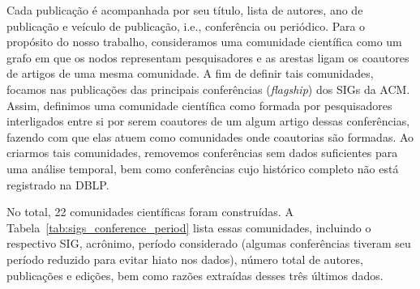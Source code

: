 Cada publicação é acompanhada por seu título, lista de autores, ano de publicação e veículo de publicação, i.e., conferência 
ou periódico. Para o propósito do nosso trabalho, consideramos uma comunidade científica como um grafo em que os nodos 
representam pesquisadores e as arestas ligam os coautores de artigos de uma mesma comunidade. A fim de definir tais 
comunidades, focamos nas publicações das principais conferências (\textit{flagship}) dos SIGs 
da ACM. Assim, definimos uma comunidade científica como formada por 
pesquisadores interligados entre si por serem coautores de um algum artigo dessas conferências, fazendo com 
que elas atuem como comunidades onde coautorias são formadas. Ao criarmos tais comunidades, removemos conferências 
sem dados suficientes para uma análise temporal, bem como conferências cujo histórico completo não está registrado 
na DBLP.

No total, 22 comunidades científicas foram construídas. A Tabela~\ref{tab:sigs_conference_period} lista essas comunidades, 
incluindo o respectivo SIG, acrônimo, período considerado (algumas conferências tiveram seu período 
reduzido para evitar hiato nos dados), número total de autores, publicações e edições, bem como razões extraídas desses 
três últimos dados.


